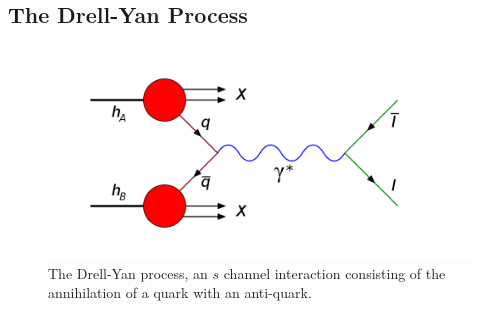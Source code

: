 
\subsection{The Drell-Yan Process}

\begin{figure}[h]
	\centering
	\includegraphics[width=4.5in]{figures/background/Drell-Yan.png}
	\caption{The Drell-Yan process, an $s$ channel interaction consisting of the annihilation of a quark with an anti-quark.}
	\label{fig:dy-diagram}
\end{figure}

